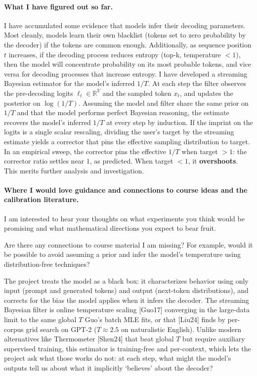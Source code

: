 \documentclass[11pt]{article}
\begin{document}
\paragraph{What I have figured out so far.}
I have accumulated some evidence that models infer their decoding parameters. Most cleanly, models learn their own blacklist (tokens set to zero probability by the decoder) if the tokens are common enough. Additionally, as sequence position $t$ increases, if the decoding process reduces entropy (top-k, temperature $< 1$), then the model will concentrate probability on its most probable tokens, and vice versa for decoding processes that increase entropy.
I have developed a streaming Bayesian estimator for the model's inferred $1/T$. At each step the filter observes the pre-decoding logits $\ell_t \in \mathbb{R}^V$ and the sampled token $x_t$, and updates the posterior on $\log(1/T)$. Assuming the model and filter share the same prior on $1/T$ and that the model performs perfect Bayesian reasoning, the estimate recovers the model's inferred $1/T$ at every step by induction. If the imprint on the logits is a single scalar rescaling, dividing the user's target by the streaming estimate yields a corrector that pins the effective sampling distribution to target.
In an empirical sweep, the corrector pins the effective $1/T$ when target $> 1$: the corrector ratio settles near $1$, as predicted. When target $< 1$, it \textbf{overshoots}. This merits further analysis and investigation.

\paragraph{Where I would love guidance and connections to course ideas and the calibration literature.}
I am interested to hear your thoughts on what experiments you think would be promising and what mathematical directions you expect to bear fruit. 

Are there any connections to course material I am missing? For example, would it be possible to avoid assuming a prior and infer the model's temperature using distribution-free techniques?

The project treats the model as a black box: it characterizes behavior using only input (prompt and generated tokens) and output (next-token distributions), and corrects for the bias the model applies when it infers the decoder. The streaming Bayesian filter is online temperature scaling [Guo17] converging in the large-data limit to the same global $T$ Guo's batch MLE fits, or that [Liu24] finds by per-corpus grid search on GPT-2 ($T\!\approx\!2.5$ on naturalistic English). Unlike modern alternatives like Thermometer [Shen24] that beat global $T$ but require auxiliary supervised training, this estimator is training-free and per-context, which lets the project ask what those works do not: at each step, what might the model's outputs tell us about what it implicitly `believes' about the decoder?
\end{document}
